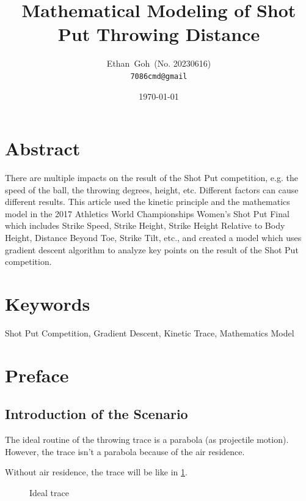 \documentclass{article}
\title{Mathematical Modeling of Shot Put Throwing Distance}
\author{Ethan\ Goh\ (No. 20230616)\\\texttt{7086cmd@gmail}}
\date{\today}
\begin{document}
\maketitle
\section*{Abstract}
There are multiple impacts on the result of the Shot Put competition, e.g. the speed of the ball, the throwing degrees, height, etc. Different factors can cause different results. This article used the kinetic principle and the mathematics model in the 2017 Athletics World Championships Women's Shot Put Final which includes Strike Speed, Strike Height, Strike Height Relative to Body Height, Distance Beyond Toe, Strike Tilt, etc., and created a model which uses gradient descent algorithm to analyze key points on the result of the Shot Put competition.

\section*{Keywords} Shot Put Competition, Gradient Descent, Kinetic Trace, Mathematics Model

\newpage

\tableofcontents

\newpage

\section{Preface}

\subsection{Introduction of the Scenario}

The ideal routine of the throwing trace is a parabola (as projectile motion). However, the trace isn't a parabola because of the air residence.

Without air residence, the trace will be like in \ref{fig:ideal-trace}.

\begin{figure}[H]
    \centering
    \caption{Ideal trace}
    \label{fig:ideal-trace}
\end{figure}
\end{document}
